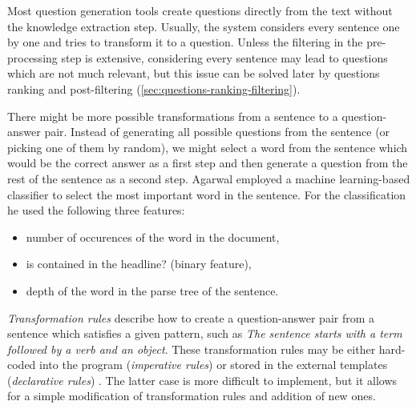 \documentclass[12pt, twoside]{fithesis2}		%
\renewcommand{\_}{\leavevmode \kern0.07em\vbox{\hrule width0.4em}}
\newcommand{\squarebullet}{\textcolor{black}{\raisebox{0.15em}{\rule{4pt}{4pt}}}}
\newcommand{\emptysquarebullet}{\textcolor{black}{\raisebox{0.10em}{\tiny$\square$}}}
\newenvironment{myItemize}{
  \begin{itemize}[leftmargin=2em,rightmargin=1em,itemsep=\parskip ,parsep=0em,topsep=0em,partopsep=0em]
  \renewcommand{\labelitemi}{\squarebullet}
  \renewcommand{\labelitemii}{\textbullet}
}{
  \end{itemize}
}
\begin{document}
Most question generation tools create questions directly from the text without the knowledge extraction step.
Usually, the system considers every sentence one by one
and tries to transform it to a question.
Unless the filtering in the pre-processing step is extensive,
considering every sentence may lead to questions which are not much relevant,
but this issue can be solved later by questions ranking and post-filtering
(\autoref{sec:questions-ranking-filtering}).

There might be more possible transformations from a sentence to a question-answer pair.
Instead of generating all possible questions from the sentence (or picking one of them by random),
we might select a word from the sentence which would be the correct answer as a first step and then generate a question from the rest of the sentence as a second step.
Agarwal \cite{question-gen-textbooks} employed a machine learning-based classifier to select the most important word in the sentence. For the classification he used the following three features:
\begin{myItemize}
\item number of occurences of the word in the document,
\item is contained in the headline? (binary feature),
\item depth of the word in the parse tree of the sentence.
\end{myItemize}

\textit{Transformation rules} describe how to create a question-answer pair from a sentence
which satisfies a given pattern,
such as \textit{The sentence starts with a term followed by a verb and an object}.
These transformation rules may be either hard-coded into the program (\textit{imperative rules})
\cite{questions-wolfe, question-overgenerating-rating, question-gen-connectives}
or stored in the external templates (\textit{declarative rules})
\cite{question-gen-ceist, questions-eval}.
The latter case is more difficult to implement, but it allows for a simple modification of transformation rules and addition of new ones.
\end{document}
